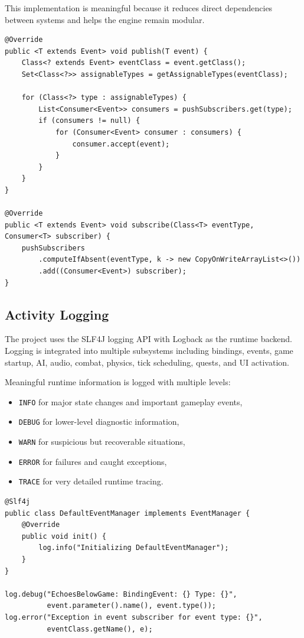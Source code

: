 \documentclass[12pt]{extarticle}
\begin{document}
This implementation is meaningful because it reduces direct dependencies between systems and helps the engine remain modular.





\begin{lstlisting}[caption={Observer pattern through event publication and subscription}]
@Override
public <T extends Event> void publish(T event) {
    Class<? extends Event> eventClass = event.getClass();
    Set<Class<?>> assignableTypes = getAssignableTypes(eventClass);

    for (Class<?> type : assignableTypes) {
        List<Consumer<Event>> consumers = pushSubscribers.get(type);
        if (consumers != null) {
            for (Consumer<Event> consumer : consumers) {
                consumer.accept(event);
            }
        }
    }
}

@Override
public <T extends Event> void subscribe(Class<T> eventType, Consumer<T> subscriber) {
    pushSubscribers
        .computeIfAbsent(eventType, k -> new CopyOnWriteArrayList<>())
        .add((Consumer<Event>) subscriber);
}
\end{lstlisting}

\subsection{Activity Logging}
The project uses the SLF4J logging API with Logback as the runtime backend. Logging is integrated into multiple subsystems including bindings, events, game startup, AI, audio, combat, physics, tick scheduling, quests, and UI activation.

Meaningful runtime information is logged with multiple levels:
\begin{itemize}[leftmargin=1.5em]
    \item \texttt{INFO} for major state changes and important gameplay events,
    \item \texttt{DEBUG} for lower-level diagnostic information,
    \item \texttt{WARN} for suspicious but recoverable situations,
    \item \texttt{ERROR} for failures and caught exceptions,
    \item \texttt{TRACE} for very detailed runtime tracing.
\end{itemize}

\begin{lstlisting}[caption={Logging with multiple levels in the event and game systems}]
@Slf4j
public class DefaultEventManager implements EventManager {
    @Override
    public void init() {
        log.info("Initializing DefaultEventManager");
    }
}

log.debug("EchoesBelowGame: BindingEvent: {} Type: {}",
          event.parameter().name(), event.type());
log.error("Exception in event subscriber for event type: {}",
          eventClass.getName(), e);
\end{lstlisting}
\end{document}
